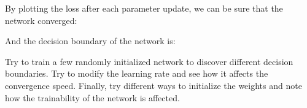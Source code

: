 \documentclass[
  a4paper,
]{article}
\newenvironment{Shaded}{\begin{snugshade}}{\end{snugshade}}
\newcommand{\AttributeTok}[1]{\textcolor[rgb]{0.77,0.63,0.00}{#1}}
\newcommand{\DecValTok}[1]{\textcolor[rgb]{0.00,0.00,0.81}{#1}}
\newcommand{\FloatTok}[1]{\textcolor[rgb]{0.00,0.00,0.81}{#1}}
\newcommand{\FunctionTok}[1]{\textcolor[rgb]{0.00,0.00,0.00}{#1}}
\newcommand{\NormalTok}[1]{#1}
\newcommand{\OtherTok}[1]{\textcolor[rgb]{0.56,0.35,0.01}{#1}}
\newcommand{\SpecialCharTok}[1]{\textcolor[rgb]{0.00,0.00,0.00}{#1}}
\begin{document}
\begin{Shaded}
\end{Shaded}

By plotting the loss after each parameter update, we can be sure that
the network converged:

\begin{Shaded}
\end{Shaded}

And the decision boundary of the network is:

\begin{Shaded}
\end{Shaded}

Try to train a few randomly initialized network to discover different
decision boundaries. Try to modify the learning rate and see how it
affects the convergence speed. Finally, try different ways to initialize
the weights and note how the trainability of the network is affected.
\end{document}
